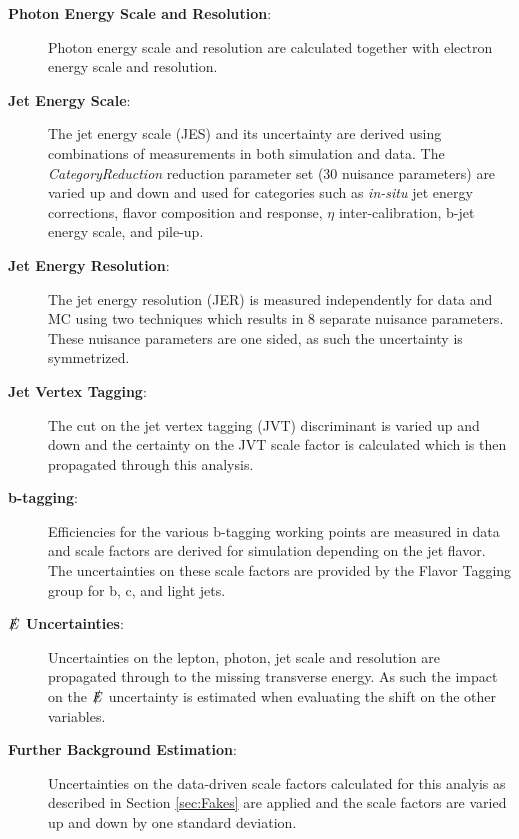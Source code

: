 \begin{description}
\item[\textbf{Photon Energy Scale and Resolution}:]  Photon energy scale and resolution are calculated together with electron energy scale and resolution.

\item[\textbf{Jet Energy Scale}:] The jet energy scale (JES) and its uncertainty are derived using combinations of measurements in both simulation and data.  The \textit{CategoryReduction} reduction parameter set (30 nuisance parameters) are varied up and down and used for categories such as \textit{in-situ} jet energy corrections, flavor composition and response, $\eta$ inter-calibration, b-jet energy scale, and pile-up.

\item[\textbf{Jet Energy Resolution}:] The jet energy resolution (JER) is measured independently for data and MC using two techniques \cite{ATL-PHYS-PUB-2015-015} which results in 8 separate nuisance parameters.  These nuisance parameters are one sided, as such the uncertainty is symmetrized.


\item[\textbf{Jet Vertex Tagging}:]  The cut on the jet vertex tagging (JVT) discriminant is varied up and down \cite{JetJVT} and the certainty on the JVT scale factor is calculated which is then propagated through this analysis.

\item[\textbf{b-tagging}:]  Efficiencies for the various b-tagging working points are measured in data and scale factors are derived for simulation depending on the jet flavor.  The uncertainties on these scale factors are provided by the Flavor Tagging group for b, c, and light jets.

\item[\textbf{$\slashed{E}$ Uncertainties}:]  Uncertainties on the lepton, photon, jet scale and resolution are propagated through to the missing transverse energy.  As such the impact on the $\slashed{E}$ uncertainty is estimated when evaluating the shift on the other variables.

\item[\textbf{Further Background Estimation}:] Uncertainties on the data-driven scale factors calculated for this analyis as described in Section \ref{sec:Fakes} are applied and the scale factors are varied up and down by one standard deviation.

\end{description}

